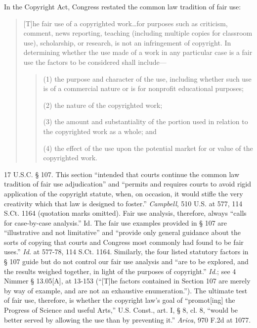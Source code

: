 In the Copyright Act, Congress restated the common law tradition of fair use:
\begin{quote}
[T]he fair use of a copyrighted work\ldots for purposes such as criticism,
comment, news reporting, teaching (including multiple copies for classroom
use), scholarship, or research, is not an infringement of copyright. In
determining whether the use made of a work in any particular case is a fair use
the factors to be considered shall include---
\begin{quotation}
(1) the purpose and character of the use, including whether such use is of a
commercial nature or is for nonprofit educational purposes;

(2) the nature of the copyrighted work;

(3) the amount and substantiality of the portion used in relation to the
copyrighted work as a whole; and

(4) the effect of the use upon the potential market for or value of the
copyrighted work.
\end{quotation}
\end{quote}
17 U.S.C. {\S} 107. This section ``intended that courts continue the common law
tradition of fair use adjudication'' and ``permits and requires courts to avoid
rigid application of the copyright statute, when, on occasion, it would stifle
the very creativity which that law is designed to foster.'' \emph{Campbell}, 510
U.S.
at 577, 114 S.Ct. 1164 (quotation marks omitted). Fair use analysis, therefore,
always ``calls for case-by-case analysis.'' Id. The fair use examples provided
in {\S} 107 are ``illustrative and not limitative'' and ``provide only general
guidance about the sorts of copying that courts and Congress most commonly had
found to be fair uses.'' \emph{Id.} at 577-78, 114 S.Ct. 1164. Similarly, the
four
listed statutory factors in {\S} 107 guide but do not control our fair use
analysis and ``are to be explored, and the results weighed together, in light
of the purposes of copyright.'' \emph{Id.}; see 4 Nimmer {\S} 13.05[A], at
13-153
(``[T]he factors contained in Section 107 are merely by way of example, and are
not an exhaustive enumeration.''). The ultimate test of fair use, therefore, is
whether the copyright law's goal of ``promot[ing] the Progress of Science and
useful Arts,'' U.S. Const., art. I, {\S} 8, cl. 8, ``would be better served by
allowing the use than by preventing it.'' \emph{Arica}, 970 F.2d at 1077.


